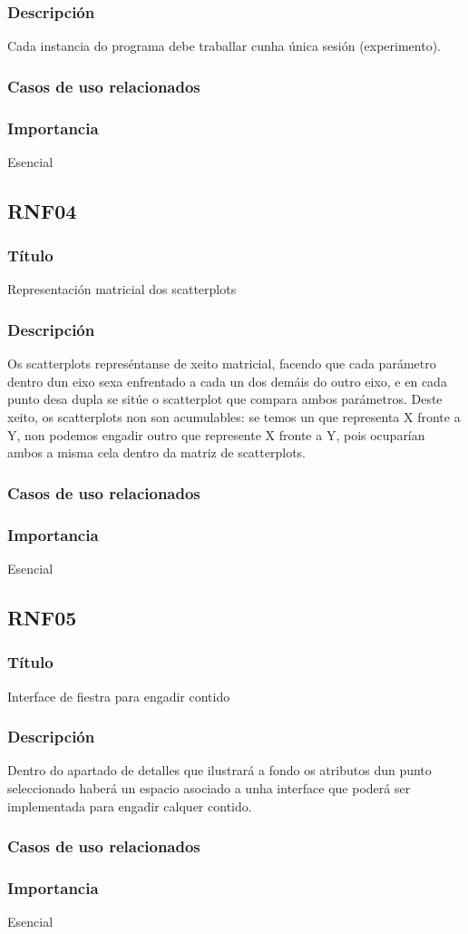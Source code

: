 \subsubsection{Descripción}
Cada instancia do programa debe traballar cunha única sesión (experimento).
\subsubsection{Casos de uso relacionados}
\subsubsection{Importancia}
Esencial

\subsection*{RNF04}
\subsubsection{Título}
Representación matricial dos scatterplots
\subsubsection{Descripción}
Os scatterplots represéntanse de xeito matricial, facendo que cada parámetro dentro dun eixo sexa enfrentado a cada un dos demáis do outro eixo, e en cada punto desa dupla se sitúe o scatterplot que compara ambos parámetros. Deste xeito, os scatterplots non son acumulables: se temos un que representa X fronte a Y, non podemos engadir outro que represente X fronte a Y, pois ocuparían ambos a misma cela dentro da matriz de scatterplots.
\subsubsection{Casos de uso relacionados}
\subsubsection{Importancia}
Esencial

\subsection*{RNF05}
\subsubsection{Título}
Interface de fiestra para engadir contido
\subsubsection{Descripción}
Dentro do apartado de detalles que ilustrará a fondo os atributos dun punto seleccionado haberá un espacio asociado a unha interface que poderá ser implementada para engadir calquer contido.
\subsubsection{Casos de uso relacionados}
\subsubsection{Importancia}
Esencial

